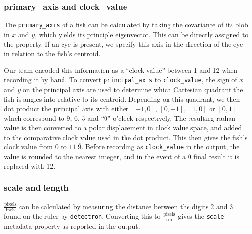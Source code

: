 \documentclass[conference]{IEEEtran}
\begin{document}
\subsubsection{primary\_axis and clock\_value}
The \verb|primary_axis| of a fish can be calculated by taking the covariance of its blob in \(x\) and \(y\), which yields its principle eigenvector. This can be directly assigned to the property. If an eye is present, we specify this axis in the direction of the eye in relation to the fish's centroid.

Our team encoded this information as a ``clock value'' between 1 and 12 when recording it by hand. To convert \verb|principal_axis| to \verb|clock_value|, the sign of \(x\) and \(y\) on the principal axis are used to determine which Cartesian quadrant the fish is angles into relative to its centroid. Depending on this quadrant, we then dot product the principal axis with either \([-1,0]\), \([0,-1]\), \([1,0]\) or \([0,1]\) which correspond to 9, 6, 3 and ``0'' o'clock respectively. The resulting radian value is then converted to a polar displacement in clock value space, and added to the comparative clock value used in the dot product. This then gives the fish's clock value from 0 to \(11.\overline{9}\). Before recording as \verb|clock_value| in the output, the value is rounded to the nearest integer, and in the event of a 0 final result it is replaced with 12.
\subsubsection{scale and length}
\(\frac{\mathrm{pixels}}{\mathrm{inch}}\) can be calculated by measuring the distance between the digits 2 and 3 found on the ruler by \verb|detectron|. Converting this to \(\frac{\mathrm{pixels}}{\mathrm{cm}}\) gives the \verb|scale| metadata property as reported in the output.
\end{document}
